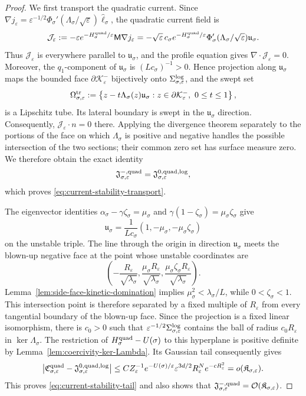 \documentclass[11pt]{article}
\numberwithin{equation}{section}
\theoremstyle{plain}
\theoremstyle{definition}
\theoremstyle{remark}
\newcommand{\eps}{\varepsilon}
\begin{document}
\begin{proof}
We first transport the quadratic current.  Since
$\nabla j_\eps=\eps^{-1/2}\Phi_\sigma'(\Lambda_\sigma/\sqrt\eps)\widehat\ell_\sigma$,
the quadratic current field is
\[
\mathcal J_\eps
:=-\eps e^{-H_\sigma^{\rm quad}/\eps}\mathsf M\nabla j_\eps
=-\sqrt\eps\,c_\sigma
e^{-H_\sigma^{\rm quad}/\eps}
\Phi_\sigma'(\Lambda_\sigma/\sqrt\eps)\mathfrak u_\sigma.
\]
Thus $\mathcal J_\eps$ is everywhere parallel to $\mathfrak u_\sigma$, and
the profile equation gives $\nabla\cdot\mathcal J_\eps=0$.  Moreover, the
$q_1$-component of $\mathfrak u_\sigma$ is
$(Lc_\sigma)^{-1}>0$.  Hence projection along $\mathfrak u_\sigma$ maps the
bounded face $\partial\mathcal K_\eps^-$ bijectively onto
$\Sigma_{\sigma,\eps}^{\rm log}$, and the swept set
\[
\Omega_{\sigma,\eps}^{\rm tr}
:=\left\{z-t\Lambda_\sigma(z)\mathfrak u_\sigma:
z\in\partial\mathcal K_\eps^-,\ 0\le t\le1\right\},
\]
is a Lipschitz tube.  Its lateral boundary is swept in the
$\mathfrak u_\sigma$ direction.  Consequently,
$\mathcal J_\eps\cdot n=0$ there.  Applying the divergence theorem separately
to the portions of the face on which $\Lambda_\sigma$ is positive and
negative handles the possible intersection of the two sections; their common
zero set has surface measure zero.  We therefore obtain the exact identity
\[
\mathfrak J_{\sigma,\eps}^{-,\rm quad}
=\mathfrak J_{\sigma,\eps}^{0,\rm quad,log},
\]
which proves \eqref{eq:current-stability-transport}.

The eigenvector identities
$\alpha_\sigma-\gamma\zeta_\sigma=\mu_\sigma$ and
$\gamma(1-\zeta_\sigma)=\mu_\sigma\zeta_\sigma$ give
\[
\mathfrak u_\sigma
=\frac{1}{Lc_\sigma}(1,-\mu_\sigma,-\mu_\sigma\zeta_\sigma)
\]
on the unstable triple.
The line through the origin in direction $\mathfrak u_\sigma$ meets the
blown-up negative face at the point whose unstable coordinates are
\[
\left(-\frac{R_\eps}{\sqrt{\lambda_\sigma}},
\frac{\mu_\sigma R_\eps}{\sqrt{\lambda_\sigma}},
\frac{\mu_\sigma\zeta_\sigma R_\eps}{\sqrt{\lambda_\sigma}}\right).
\]
Lemma~\ref{lem:side-face-kinetic-domination} implies
$\mu_\sigma^2<\lambda_\sigma/L$, while $0<\zeta_\sigma<1$.
This intersection point is therefore separated by a fixed multiple of $R_\eps$
from every tangential boundary of the blown-up face.  Since the projection is
a fixed linear isomorphism, there is $c_0>0$ such that
$\eps^{-1/2}\Sigma_{\sigma,\eps}^{\rm log}$ contains the ball of radius
$c_0R_\eps$ in $\ker\Lambda_\sigma$.  The restriction of
$H_\sigma^{\rm quad}-U(\sigma)$ to this hyperplane is positive definite by
Lemma~\ref{lem:coercivity-ker-Lambda}.  Its Gaussian tail consequently gives
\[
\left|\mathfrak C_{\sigma,\eps}^{\rm quad}
-\mathfrak J_{\sigma,\eps}^{0,\rm quad,log}\right|
\le C Z_\eps^{-1}e^{-U(\sigma)/\eps}
\eps^{3d/2}R_\eps^N e^{-cR_\eps^2}
=o(\mathfrak K_{\sigma,\eps}).
\]
This proves \eqref{eq:current-stability-tail} and also shows that
$\mathfrak J_{\sigma,\eps}^{-,\rm quad}=\mathcal O(\mathfrak K_{\sigma,\eps})$.


\end{proof}
\end{document}
